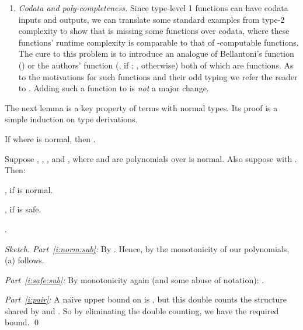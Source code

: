 \documentclass[envcountsame]{llncs}
\begin{document}
\begin{enumerate}
\item

  \emph{Codata and poly-completeness.}
  Since type-level 1  functions can have codata inputs 
  and outputs, we can translate some standard examples from
  type-2 complexity to show that  is missing some 
  functions over codata, where these functions' runtime
  complexity is comparable to that of -computable 
  functions. 
  The cure to this problem is to introduce an analogue of 
  Bellantoni's  function 
  \cite[Chapter 8]{bellantoni:thesis}  
  () or the authors' 
  function \cite[\S4]{DR:ATS:LMCS}
  (, if ; 
  , otherwise) both of which are 
   functions. 
  As to the motivations for such functions and their odd typing
  we refer the reader to \cite{DR:ATS:LMCS}.
  Adding such a function to  is \emph{not} a major change.
  

\end{enumerate}




The next lemma is a key property of terms with normal types.
Its proof is a simple induction on type derivations.

\begin{lemma}
\label{l:L1:sclosed} 
  If 
 where  is normal,
  then .
\end{lemma} 


\begin{lemma} \label{l:ph}
Suppose , 
, 
, 
and , 
where  and  are  polynomials over 
 is normal.
Also suppose  with .
Then:
\begin{asparaenum}[(a)]
 \item \label{i:norm:sub}
,
     if  is normal.
  \item \label{i:safe:sub}
,
    if  is safe.
  \item  \label{i:pair}
.
\end{asparaenum}
\end{lemma}

\begin{proof}[Sketch]
\emph{Part~\eqref{i:norm:sub}:} By . 
Hence, by the monotonicity of our polynomials, (a) follows.


\emph{Part~\eqref{i:safe:sub}:}
By monotonicity again 
(and some  abuse of notation):
.

\emph{Part~\eqref{i:pair}:}
A na\"{\i}ve upper bound on  is 
, but this double counts the
structure shared by  and . 
So by eliminating the double counting, 
we have the required bound. 
\qed
\end{proof}
\end{document}

